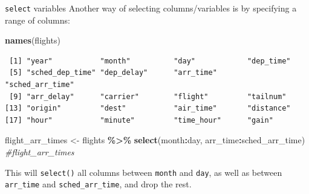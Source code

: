 \documentclass[
  ignorenonframetext,
]{beamer}
\newenvironment{Shaded}{\begin{snugshade}}{\end{snugshade}}
\newcommand{\CommentTok}[1]{\textcolor[rgb]{0.56,0.35,0.01}{\textit{#1}}}
\newcommand{\FunctionTok}[1]{\textcolor[rgb]{0.13,0.29,0.53}{\textbf{#1}}}
\newcommand{\NormalTok}[1]{#1}
\newcommand{\OtherTok}[1]{\textcolor[rgb]{0.56,0.35,0.01}{#1}}
\newcommand{\SpecialCharTok}[1]{\textcolor[rgb]{0.81,0.36,0.00}{\textbf{#1}}}
\begin{document}
\begin{frame}[fragile]{\texttt{select} variables}
\protect\hypertarget{select-variables-2}{}
Another way of selecting columns/variables is by specifying a range of
columns:

\small

\begin{Shaded}
\begin{Highlighting}[]
\FunctionTok{names}\NormalTok{(flights)}
\end{Highlighting}
\end{Shaded}

\begin{verbatim}
 [1] "year"           "month"          "day"            "dep_time"      
 [5] "sched_dep_time" "dep_delay"      "arr_time"       "sched_arr_time"
 [9] "arr_delay"      "carrier"        "flight"         "tailnum"       
[13] "origin"         "dest"           "air_time"       "distance"      
[17] "hour"           "minute"         "time_hour"      "gain"          
\end{verbatim}

\begin{Shaded}
\begin{Highlighting}[]
\NormalTok{flight\_arr\_times }\OtherTok{\textless{}{-}}\NormalTok{ flights }\SpecialCharTok{\%\textgreater{}\%} 
  \FunctionTok{select}\NormalTok{(month}\SpecialCharTok{:}\NormalTok{day, arr\_time}\SpecialCharTok{:}\NormalTok{sched\_arr\_time)}
\CommentTok{\#flight\_arr\_times}
\end{Highlighting}
\end{Shaded}

\normalsize

This will \texttt{select()} all columns between \texttt{month} and
\texttt{day}, as well as between \texttt{arr\_time} and
\texttt{sched\_arr\_time}, and drop the rest.
\end{frame}
\end{document}
